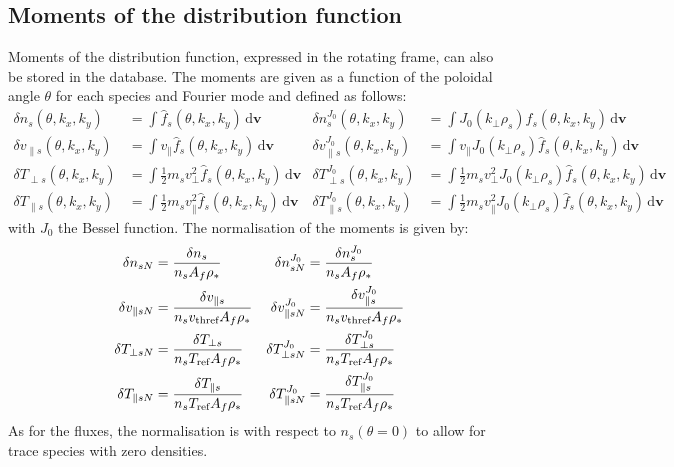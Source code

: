 \documentclass[a4paper]{report}
\begin{document}
\subsection{Moments of the distribution function}
Moments of the distribution function, expressed in the rotating frame, can also be stored in the database. The moments are given as a function of the poloidal angle $\theta$ for each species and Fourier mode and defined as follows:
\begin{align*}
\delta n_s(\theta,k_x,k_y) & =  \int \hat{f}_s(\theta,k_x,k_y) \,\textrm{d}\mathbf{v}& \delta n_s^{J_0}(\theta,k_x,k_y) & =  \int J_0(k_\perp\rho_s) \hat{f}_s(\theta,k_x,k_y) \,\textrm{d}\mathbf{v} \\
\delta v_{\parallel s}(\theta,k_x,k_y) & =  \int v_\parallel \hat{f}_s(\theta,k_x,k_y) \,\textrm{d}\mathbf{v}& \delta v_{\parallel s}^{J_0}(\theta,k_x,k_y) & =  \int v_\parallel J_0(k_\perp\rho_s) \hat{f}_s(\theta,k_x,k_y) \,\textrm{d}\mathbf{v}\\
\delta T_{\perp s}(\theta,k_x,k_y) & =  \int \frac{1}{2}m_s v_\perp^2 \hat{f}_s(\theta,k_x,k_y) \,\textrm{d}\mathbf{v}& \delta T_{\perp s}^{J_0}(\theta,k_x,k_y) & =  \int \frac{1}{2}m_s v_\perp^2 J_0(k_\perp\rho_s) \hat{f}_s(\theta,k_x,k_y) \,\textrm{d}\mathbf{v}\\
\delta T_{\parallel s}(\theta,k_x,k_y) & =  \int \frac{1}{2}m_s v_\parallel^2 \hat{f}_s(\theta,k_x,k_y) \,\textrm{d}\mathbf{v}& \delta T_{\parallel s}^{J_0}(\theta,k_x,k_y) & =  \int \frac{1}{2}m_s v_\parallel^2 J_0(k_\perp\rho_s) \hat{f}_s(\theta,k_x,k_y) \,\textrm{d}\mathbf{v}
\end{align*}
with $J_0$ the Bessel function. The normalisation of the moments is given by:
\begin{align*}
\delta n_{sN} & = \frac{\delta n_s}{n_s A_f\rho_*}& \delta n_{sN}^{J_0} & = \frac{\delta n_s^{J_0}}{n_s A_f\rho_*} \\
\delta v_{\parallel sN} & = \frac{\delta v_{\parallel s}}{n_sv_\textrm{thref} A_f\rho_*}& \delta v_{\parallel sN}^{J_0} & = \frac{\delta v_{\parallel s}^{J_0}}{n_sv_\textrm{thref} A_f\rho_*} \\
\delta T_{\perp sN} & = \frac{\delta T_{\perp s}}{n_s T_{\textrm{ref}} A_f\rho_*}& \delta T_{\perp sN}^{J_0} & = \frac{\delta T_{\perp s}^{J_0}}{n_s T_{\textrm{ref}} A_f\rho_*} \\
\delta T_{\parallel sN} & = \frac{\delta T_{\parallel s}}{n_s T_{\textrm{ref}} A_f\rho_*}& \delta T_{\parallel sN}^{J_0} & = \frac{\delta T_{\parallel s}^{J_0}}{n_s T_{\textrm{ref}} A_f\rho_*} 
\end{align*}
As for the fluxes, the normalisation is with respect to $n_s(\theta=0)$ to allow for trace species with zero densities. 
\end{document}
